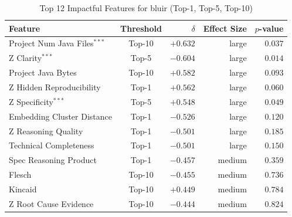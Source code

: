 \begin{table}[h]
\centering
\caption{Top 12 Impactful Features for bluir (Top-1, Top-5, Top-10)}
\label{tab:tool_features_bluir_combined}
\begin{tabular}{lcrrr}
\toprule
Feature & Threshold & $\delta$ & Effect Size & $p$-value \\
\midrule
Project Num Java Files$^{***}$ & Top-10 & $+0.632$ & large & $0.037$ \\
Z Clarity$^{***}$ & Top-5 & $-0.604$ & large & $0.014$ \\
Project Java Bytes & Top-10 & $+0.582$ & large & $0.093$ \\
Z Hidden Reproducibility & Top-1 & $+0.562$ & large & $0.060$ \\
Z Specificity$^{***}$ & Top-5 & $+0.548$ & large & $0.049$ \\
Embedding Cluster Distance & Top-1 & $-0.526$ & large & $0.120$ \\
Z Reasoning Quality & Top-1 & $-0.501$ & large & $0.185$ \\
Technical Completeness & Top-1 & $-0.501$ & large & $0.150$ \\
Spec Reasoning Product & Top-1 & $-0.457$ & medium & $0.359$ \\
Flesch & Top-10 & $-0.455$ & medium & $0.736$ \\
Kincaid & Top-10 & $+0.449$ & medium & $0.784$ \\
Z Root Cause Evidence & Top-10 & $-0.444$ & medium & $0.824$ \\
\bottomrule
\end{tabular}
\end{table}

